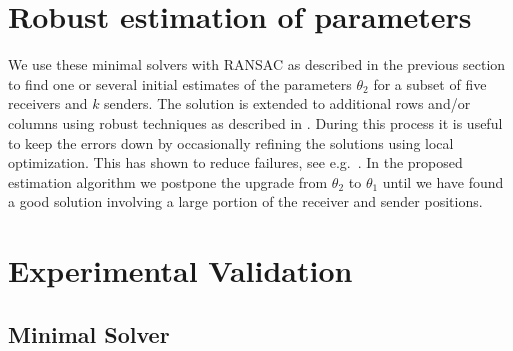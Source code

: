 \documentclass{article}
\begin{document}
\section{Robust estimation of parameters}
\label{sec:ransac}
\vspace{-5pt}
We use these minimal solvers with RANSAC as described in the previous section to find one or several initial estimates of the parameters $\theta_2$ for a subset of five receivers and $k$ senders. The solution is extended to additional rows and/or columns using robust techniques as described in \cite{batstone2016robust}. During this process it is useful to keep the errors down by occasionally refining the solutions using local optimization. This has shown to reduce failures, see e.g.\ \cite{engels-stewenius-etal-06,klein2007parallel}.
In the proposed estimation algorithm we postpone the upgrade from $\theta_2$ to $\theta_1$ until we have found a good solution involving a large portion of the receiver and sender positions. 
\vspace{-5pt}
\section{Experimental Validation}
\label{sec:exp}
\vspace{-5pt}
\subsection{Minimal Solver}
\vspace{-5pt}
\end{document}
